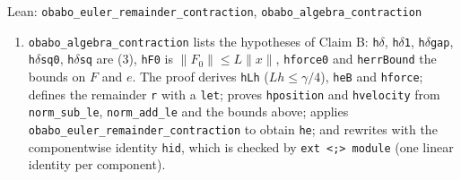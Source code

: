 \documentclass[11pt,a4paper]{article}
\begin{document}
\begin{leanbox}{Lean: \texttt{obabo\_\allowbreak{}euler\_\allowbreak{}remainder\_\allowbreak{}contraction}, \texttt{obabo\_\allowbreak{}algebra\_\allowbreak{}contraction}}
\begin{enumerate}
\item \texttt{obabo\_\allowbreak{}algebra\_\allowbreak{}contraction} lists the hypotheses of Claim B: \texttt{h\ensuremath{\delta}}, \texttt{h\ensuremath{\delta}1}, \texttt{h\ensuremath{\delta}gap}, \texttt{h\ensuremath{\delta}sq0}, \texttt{h\ensuremath{\delta}sq} are (3), \texttt{h\allowbreak{}F0} is \(\|F_0\|\le L\|x\|\), \texttt{hforce0} and \texttt{herr\allowbreak{}Bound} the bounds on \(F\) and \(e\). The proof derives \texttt{h\allowbreak{}Lh} (\(Lh\le\gamma/4\)), \texttt{he\allowbreak{}B} and \texttt{hforce}; defines the remainder \texttt{r} with a \texttt{let}; proves \texttt{hposition} and \texttt{hvelocity} from \texttt{norm\_\allowbreak{}sub\_\allowbreak{}le}, \texttt{norm\_\allowbreak{}add\_\allowbreak{}le} and the bounds above; applies \texttt{obabo\_\allowbreak{}euler\_\allowbreak{}remainder\_\allowbreak{}contraction} to obtain \texttt{he}; and rewrites with the componentwise identity \texttt{hid}, which is checked by \texttt{ext <;> module} (one linear identity per component).

\end{enumerate}
\end{leanbox}
\end{document}

